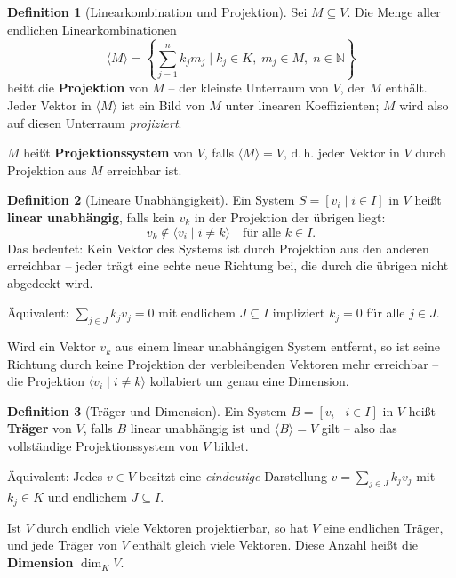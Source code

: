 ﻿\documentclass[a4paper,12pt]{report}
\theoremstyle{definition}
\newtheorem{definition}{Definition}
\begin{document}
\begin{definition}[Linearkombination und Projektion]
    Sei $M \subseteq V$. Die Menge aller endlichen Linearkombinationen
    \[
        \langle M \rangle = \left\{ \sum_{j=1}^{n} k_j m_j \;\Big|\;
        k_j \in K,\; m_j \in M,\; n \in \mathbb{N} \right\}
    \]
    heißt die \textbf{Projektion} von $M$ -- der kleinste Unterraum
    von $V$, der $M$ enthält. Jeder Vektor in $\langle M \rangle$ ist
    ein Bild von $M$ unter linearen Koeffizienten; $M$ wird also auf
    diesen Unterraum \emph{projiziert}.

    $M$ heißt \textbf{Projektionssystem} von $V$, falls $\langle M \rangle = V$,
    d.\,h. jeder Vektor in $V$ durch Projektion aus $M$ erreichbar ist.
\end{definition}

\begin{definition}[Lineare Unabhängigkeit]
    Ein System $S = [v_i \mid i \in I]$ in $V$ heißt \textbf{linear unabhängig},
    falls kein $v_k$ in der Projektion der übrigen liegt:
    \[
        v_k \notin \langle v_i \mid i \neq k \rangle \quad \text{für alle } k \in I.
    \]
    Das bedeutet: Kein Vektor des Systems ist durch Projektion aus den
    anderen erreichbar -- jeder trägt eine echte neue Richtung bei, die
    durch die übrigen nicht abgedeckt wird.

    Äquivalent: $\sum_{j \in J} k_j v_j = 0$ mit endlichem $J \subseteq I$
    impliziert $k_j = 0$ für alle $j \in J$.

    Wird ein Vektor $v_k$ aus einem linear unabhängigen System entfernt,
    so ist seine Richtung durch keine Projektion der verbleibenden Vektoren
    mehr erreichbar -- die Projektion $\langle v_i \mid i \neq k \rangle$
    kollabiert um genau eine Dimension.
\end{definition}

\begin{definition}[Träger und Dimension]
    Ein System $B = [v_i \mid i \in I]$ in $V$ heißt \textbf{Träger} von $V$,
    falls $B$ linear unabhängig ist und $\langle B \rangle = V$ gilt --
    also das vollständige Projektionssystem von $V$ bildet.

    Äquivalent: Jedes $v \in V$ besitzt eine \emph{eindeutige} Darstellung
    $v = \sum_{j \in J} k_j v_j$ mit $k_j \in K$ und endlichem $J \subseteq I$.

    Ist $V$ durch endlich viele Vektoren projektierbar, so hat $V$ eine
    endlichen Träger, und jede Träger von $V$ enthält gleich viele Vektoren.
    Diese Anzahl heißt die \textbf{Dimension} $\dim_K V$.
\end{definition}
\end{document}
